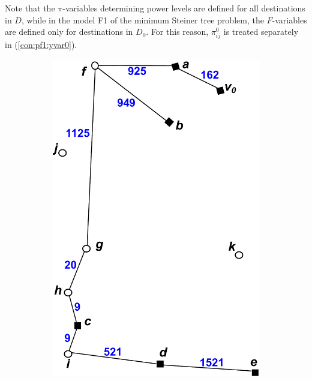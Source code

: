 Note that the $\pi$-variables determining power levels are defined for all destinations in $D$, while in the model F1 \cite{Polzin} of the minimum Steiner tree problem, the $F$-variables are defined only for destinations in $D_0$.
For this reason, $\pi_{ij}^0$ is treated separately in (\ref{con:pf1:yvar0}).
\begin{figure}[!htb]
    \centering
    \begin{subfigure}[b]{0.4\textwidth}
        \includegraphics[width=\textwidth]{conBNec}

\end{subfigure}
\end{figure}
